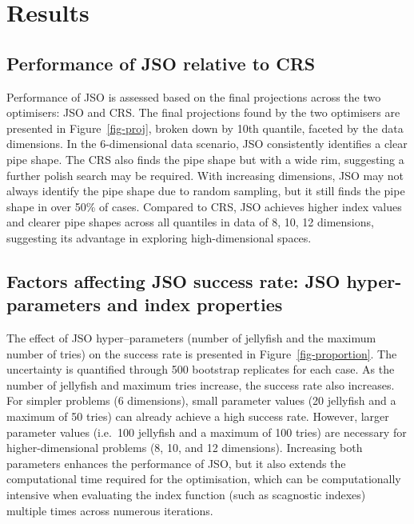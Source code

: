 \documentclass[
  12pt,
]{interact}
\theoremstyle{plain}
\begin{document}
\section{Results}\label{sec-sim-res}

\subsection{Performance of JSO relative to
CRS}\label{performance-of-jso-relative-to-crs}

Performance of JSO is assessed based on the final projections across the
two optimisers: JSO and CRS. The final projections found by the two
optimisers are presented in Figure~\ref{fig-proj}, broken down by 10th
quantile, faceted by the data dimensions. In the 6-dimensional data
scenario, JSO consistently identifies a clear pipe shape. The CRS also
finds the pipe shape but with a wide rim, suggesting a further polish
search may be required. With increasing dimensions, JSO may not always
identify the pipe shape due to random sampling, but it still finds the
pipe shape in over 50\% of cases. Compared to CRS, JSO achieves higher
index values and clearer pipe shapes across all quantiles in data of 8,
10, 12 dimensions, suggesting its advantage in exploring
high-dimensional spaces.

\subsection{Factors affecting JSO success rate: JSO hyper-parameters and
index
properties}\label{factors-affecting-jso-success-rate-jso-hyper-parameters-and-index-properties}

The effect of JSO hyper--parameters (number of jellyfish and the maximum
number of tries) on the success rate is presented in
Figure~\ref{fig-proportion}. The uncertainty is quantified through 500
bootstrap replicates for each case. As the number of jellyfish and
maximum tries increase, the success rate also increases. For simpler
problems (6 dimensions), small parameter values (20 jellyfish and a
maximum of 50 tries) can already achieve a high success rate. However,
larger parameter values (i.e.~100 jellyfish and a maximum of 100 tries)
are necessary for higher-dimensional problems (8, 10, and 12
dimensions). Increasing both parameters enhances the performance of JSO,
but it also extends the computational time required for the
optimisation, which can be computationally intensive when evaluating the
index function (such as scagnostic indexes) multiple times across
numerous iterations.
\end{document}
